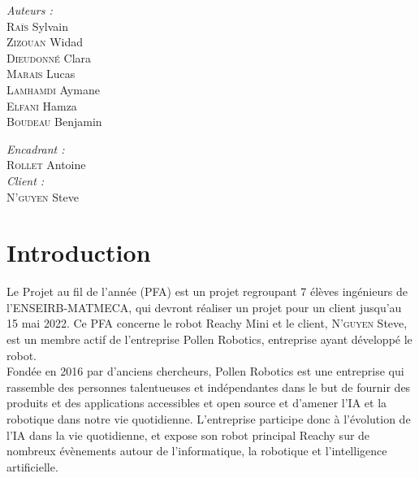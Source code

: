 \begin{titlepage}
\begin{minipage}[b]{0.40\linewidth}
        \flushleft 
        \large
        \emph{Auteurs :} \\
        \textsc{Raïs} Sylvain \\
        \textsc{Zizouan} Widad\\
        \textsc{Dieudonné} Clara \\
        \textsc{Marais} Lucas \\
        \textsc{Lamhamdi} Aymane \\
        \textsc{Elfani} Hamza \\
        \textsc{Boudeau} Benjamin\\
    \end{minipage} \hfill
    \begin{minipage}[b]{0.40\linewidth}
        \flushright 
        \large 
        \emph{Encadrant :} \\
        \textsc{Rollet} Antoine \\
        \emph{Client :} \\
        \textsc{N'guyen} Steve \\
    \end{minipage} \hfill

\end{titlepage}

\tableofcontents
\newpage

\section{Introduction}

Le Projet au fil de l'année (PFA) est un projet regroupant 7 élèves ingénieurs de l'ENSEIRB-MATMECA, qui devront réaliser un projet pour un client jusqu'au 15 mai 2022. Ce PFA concerne le robot Reachy Mini et le client, \textsc{N'guyen} Steve, est un membre actif de l'entreprise Pollen Robotics, entreprise ayant développé le robot. \\

Fondée en 2016 par d'anciens chercheurs, Pollen Robotics est une entreprise qui rassemble des personnes talentueuses et indépendantes dans le but de fournir des produits et des applications accessibles et open source et d'amener l'IA et la robotique dans notre vie quotidienne. L'entreprise participe donc à l'évolution de l'IA dans la vie quotidienne, et expose son robot principal Reachy sur de nombreux évènements autour de l'informatique, la robotique et l'intelligence artificielle. \\

